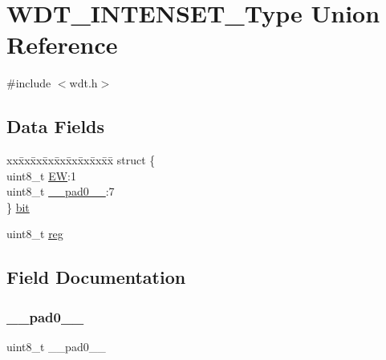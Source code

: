 \hypertarget{union_w_d_t___i_n_t_e_n_s_e_t___type}{}\section{W\+D\+T\+\_\+\+I\+N\+T\+E\+N\+S\+E\+T\+\_\+\+Type Union Reference}
\label{union_w_d_t___i_n_t_e_n_s_e_t___type}


{\ttfamily \#include $<$wdt.\+h$>$}

\subsection*{Data Fields}
\begin{DoxyCompactItemize}
\item 
\begin{tabbing}
xx\=xx\=xx\=xx\=xx\=xx\=xx\=xx\=xx\=\kill
struct \{\\
\>uint8\_t \mbox{\hyperlink{union_w_d_t___i_n_t_e_n_s_e_t___type_a187628158e640ab75b63af25c00d9ba7}{EW}}:1\\
\>uint8\_t \mbox{\hyperlink{union_w_d_t___i_n_t_e_n_s_e_t___type_a8b4eebe79ded0459acec2f4950102ba3}{\_\_pad0\_\_}}:7\\
\} \mbox{\hyperlink{union_w_d_t___i_n_t_e_n_s_e_t___type_a7a26d50182a3ddd45ef71e4c844dbfb2}{bit}}\\

\end{tabbing}\item 
uint8\+\_\+t \mbox{\hyperlink{union_w_d_t___i_n_t_e_n_s_e_t___type_a9428adc9af4653a2050e2536b55dec8d}{reg}}
\end{DoxyCompactItemize}


\subsection{Field Documentation}
\mbox{\label{union_w_d_t___i_n_t_e_n_s_e_t___type_a8b4eebe79ded0459acec2f4950102ba3}} 
\subsubsection{\texorpdfstring{\_\_pad0\_\_}{\_\_pad0\_\_}}
{\footnotesize\ttfamily uint8\+\_\+t \+\_\+\+\_\+pad0\+\_\+\+\_\+}

